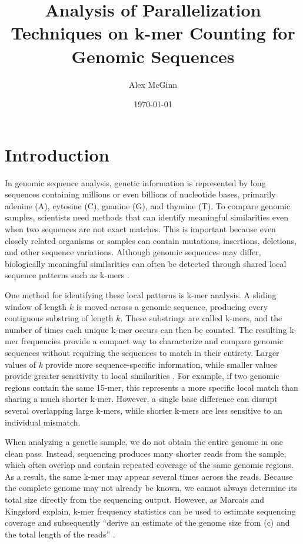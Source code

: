 \documentclass{article}
\title{Analysis of Parallelization Techniques on k-mer Counting for Genomic Sequences}
\author{Alex McGinn}
\date{\today}
\begin{document}
\maketitle

\section{Introduction}

\vspace{\baselineskip}

In genomic sequence analysis, genetic information is represented by long sequences containing millions or even billions of nucleotide 
bases, primarily adenine (A), cytosine (C), guanine (G), and thymine (T). To compare genomic samples, scientists need methods that can 
identify meaningful similarities even when two sequences are not exact matches. This is important because even closely related organisms 
or samples can contain mutations, insertions, deletions, and other sequence variations. Although genomic sequences may differ, 
biologically meaningful similarities can often be detected through shared local sequence patterns such as k-mers \cite{moeckel2024kmer}.

\vspace{\baselineskip}

One method for identifying these local patterns is k-mer analysis. A sliding window of length \(k\) is moved across a genomic sequence, 
producing every contiguous substring of length \(k\). These substrings are called k-mers, and the number of times each unique k-mer occurs 
can then be counted. The resulting k-mer frequencies provide a compact way to characterize and compare genomic sequences without requiring 
the sequences to match in their entirety. Larger values of \(k\) provide more sequence-specific information, while smaller values provide 
greater sensitivity to local similarities \cite{lees2016seer}. For example, if two genomic regions contain the same 15-mer, this represents 
a more specific local match than sharing a much shorter k-mer. However, a single base difference can disrupt several overlapping large k-mers, 
while shorter k-mers are less sensitive to an individual mismatch.

\vspace{\baselineskip}

When analyzing a genetic sample, we do not obtain the entire genome in one clean pass. Instead, sequencing produces many shorter reads from the sample,
which often overlap and contain repeated coverage of the same genomic regions. As a result, the same k-mer may appear several times across the reads.
Because the complete genome may not already be known, we cannot always determine its total size directly from the sequencing output. However, as Marcais
and Kingsford explain, k-mer frequency statistics can be used to estimate sequencing coverage and subsequently ``derive an estimate of the genome size
from (c) and the total length of the reads'' \cite{marcais2011jellyfish}.
\end{document}

